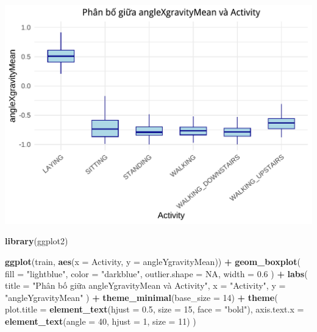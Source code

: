 \documentclass[
]{article}
\newenvironment{Shaded}{\begin{snugshade}}{\end{snugshade}}
\newcommand{\AttributeTok}[1]{\textcolor[rgb]{0.13,0.29,0.53}{#1}}
\newcommand{\ConstantTok}[1]{\textcolor[rgb]{0.56,0.35,0.01}{#1}}
\newcommand{\DecValTok}[1]{\textcolor[rgb]{0.00,0.00,0.81}{#1}}
\newcommand{\FloatTok}[1]{\textcolor[rgb]{0.00,0.00,0.81}{#1}}
\newcommand{\FunctionTok}[1]{\textcolor[rgb]{0.13,0.29,0.53}{\textbf{#1}}}
\newcommand{\NormalTok}[1]{#1}
\newcommand{\SpecialCharTok}[1]{\textcolor[rgb]{0.81,0.36,0.00}{\textbf{#1}}}
\newcommand{\StringTok}[1]{\textcolor[rgb]{0.31,0.60,0.02}{#1}}
\begin{document}
\includegraphics{report_files/figure-latex/unnamed-chunk-19-1.pdf}

\begin{Shaded}
\begin{Highlighting}[]
\FunctionTok{library}\NormalTok{(ggplot2)}

\FunctionTok{ggplot}\NormalTok{(train, }\FunctionTok{aes}\NormalTok{(}\AttributeTok{x =}\NormalTok{ Activity, }\AttributeTok{y =}\NormalTok{ angleYgravityMean)) }\SpecialCharTok{+}
  \FunctionTok{geom\_boxplot}\NormalTok{(}
    \AttributeTok{fill =} \StringTok{"lightblue"}\NormalTok{,}
    \AttributeTok{color =} \StringTok{"darkblue"}\NormalTok{,}
    \AttributeTok{outlier.shape =} \ConstantTok{NA}\NormalTok{,}
    \AttributeTok{width =} \FloatTok{0.6}
\NormalTok{  ) }\SpecialCharTok{+}
  \FunctionTok{labs}\NormalTok{(}
    \AttributeTok{title =} \StringTok{"Phân bố giữa angleYgravityMean và Activity"}\NormalTok{,}
    \AttributeTok{x =} \StringTok{"Activity"}\NormalTok{,}
    \AttributeTok{y =} \StringTok{"angleYgravityMean"}
\NormalTok{  ) }\SpecialCharTok{+}
  \FunctionTok{theme\_minimal}\NormalTok{(}\AttributeTok{base\_size =} \DecValTok{14}\NormalTok{) }\SpecialCharTok{+}
  \FunctionTok{theme}\NormalTok{(}
    \AttributeTok{plot.title =} \FunctionTok{element\_text}\NormalTok{(}\AttributeTok{hjust =} \FloatTok{0.5}\NormalTok{, }\AttributeTok{size =} \DecValTok{15}\NormalTok{, }\AttributeTok{face =} \StringTok{"bold"}\NormalTok{),}
    \AttributeTok{axis.text.x =} \FunctionTok{element\_text}\NormalTok{(}\AttributeTok{angle =} \DecValTok{40}\NormalTok{, }\AttributeTok{hjust =} \DecValTok{1}\NormalTok{, }\AttributeTok{size =} \DecValTok{11}\NormalTok{)}
\NormalTok{  )}
\end{Highlighting}
\end{Shaded}
\end{document}
